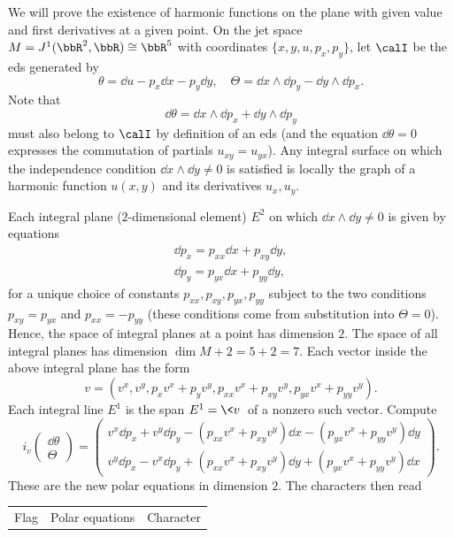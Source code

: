 \begin{example}
    We will prove the existence of harmonic functions on the plane with given value and first derivatives at a given point. On the jet space $M=J^1(\bbR^2,\bbR)\cong\bbR^5$ with coordinates $\{x,y,u,p_x,p_y\}$, let $\calI$ be the \gls{eds} generated by 
    \[\theta=\dd u-p_x \dd x-p_y\dd y,\quad \Theta=\dd x\wedge \dd p_y-\dd y\wedge\dd p_x.\]
    Note that 
    \[\dd\theta=\dd x\wedge \dd p_x+\dd y\wedge \dd p_y\]
    must also belong to $\calI$ by definition of an \gls{eds} (and the equation $\dd \theta=0$ expresses the commutation of partials $u_{xy}=u_{yx}$). Any integral surface on which the independence condition $\dd x\wedge\dd y\neq 0$ is satisfied is locally the graph of a harmonic function $u(x,y)$ and its derivatives $u_x,u_y$.

    Each integral plane ($2$-dimensional element) $E^2$ on which $\dd x\wedge\dd y\neq 0$ is given by equations 
    \begin{align}
        \dd p_x=p_{xx}\dd x+p_{xy}\dd y,\\
        \dd p_y=p_{yx}\dd x+p_{yy}\dd y,
    \end{align}
    for a unique choice of constants $p_{xx},p_{xy},p_{yx},p_{yy}$ subject to the two conditions $p_{xy}=p_{yx}$ and $p_{xx}=-p_{yy}$ (these conditions come from substitution into $\Theta=0$). Hence, the space of integral planes at a point has dimension $2$. The space of all integral planes has dimension $\dim M+2=5+2=7$. Each vector inside the above integral plane has the form 
    \[v=\left(v^x,v^y,p_xv^x+p_yv^y,p_{xx}v^x+p_{xy}v^y,p_{yx}v^x+p_{yy}v^y\right).\]
    Each integral line $E^1$ is the span $E^1=\<v\>$ of a nonzero such vector. Compute 
    \[i_v \begin{pmatrix}
        \dd \theta \\
        \Theta
    \end{pmatrix}=
    \begin{pmatrix}
        v^x \dd p_x+v^y\dd p_y-(p_{xx}v^x+p_{xy}v^y)\dd x-(p_{yx}v^x+p_{yy}v^y)\dd y\\
        v^y\dd p_x-v^x\dd p_y+(p_{xx}v^x+p_{xy}v^y)\dd y+(p_{yx}v^x+p_{yy}v^y)\dd x
    \end{pmatrix}.
    \]
   These are the new polar equations in dimension $2$. The characters then read 
    \begin{center}
        \begin{tabular}{l r r} 
         Flag & Polar equations & Character \\ [0.5ex] 

\end{tabular}
\end{center}
\end{example}
